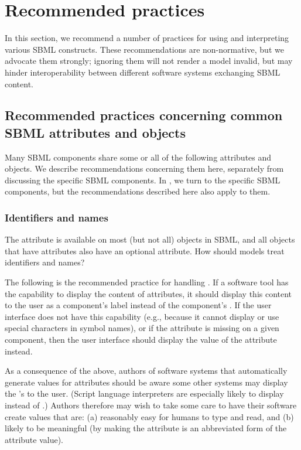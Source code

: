 
\section{Recommended practices}
\label{sec:best-practices}

In this section, we recommend a number of practices for using and
interpreting various SBML constructs.  These recommendations are
non-normative, but we advocate them strongly; ignoring them will
not render a model invalid, but may hinder interoperability
between different software systems exchanging SBML content.


\subsection{Recommended practices concerning common SBML
  attributes and objects}
\label{sec:bp:common}

Many SBML components share some or all of the following attributes
and objects.  We describe recommendations concerning them here,
separately from discussing the specific SBML components.  In
, we turn to the specific SBML
components, but the recommendations described here also apply to
them.


\subsubsection{Identifiers and names}
\label{sec:bp:names}

The  attribute is available on most (but not all)
objects in SBML, and all objects that have  attributes
also have an optional  attribute.  How should models
treat identifiers and names?

The following is the recommended practice for handling
.  If a software tool has the capability to
display the content of  attributes, it should
display this content to the user as a component's label instead of
the component's .  If the user interface does not have
this capability (e.g., because it cannot display or use special
characters in symbol names), or if the  attribute is
missing on a given component, then the user interface should
display the value of the  attribute instead.

As a consequence of the above, authors of software systems that
automatically generate values for  attributes should be
aware some other systems may display the 's to the user.
(Script language interpreters are especially likely to display
 instead of .)  Authors therefore may wish
to take some care to have their software create  values
that are: (a) reasonably easy for humans to type and read, and (b)
likely to be meaningful (\eg by making the  attribute is
an abbreviated form of the  attribute value).



